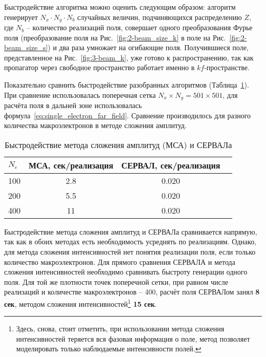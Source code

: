 Быстродействие алгоритма можно оценить следующим образом: алгоритм генерирует $N_x \cdot N_y \cdot N_b$ случайных величин, подчиняющихся распределению $Z$, где $N_b$ -- количество реализаций поля, совершает одного преобразования Фурье поля (преобразование поля на Рис.~\ref{fig:2-beam_size_k} в поле на Рис.~\ref{fig:2-beam_size_s}) и два раза умножает на огибающие поля. Получившиеся поле, представленное на Рис.~\ref{fig:3-beam_k}, уже готово к распространению, так как пропагатор через свободное пространство работает именно в $kf$-пространстве. 

Показательно сравнить быстродействие разобранных алгоритмов (Таблица~\ref{tab:speed}). При сравнение использовалась поперечная сетка $N_x \times N_y = 501 \times 501$, для расчёта поля в дальней зоне использовалась формула~\ref{eq:single_electron_far_field}. Сравнение производилось для разного количества макроэлектронов в методе сложения амплитуд.
\begin{table}[H]
	\caption{Быстродействие метода сложения амплитуд (МСА) и СЕРВАЛа}
	\label{tab:speed}	
	\begin{tabular}{l|c|c|c}
	$N_e$ & МСА, сек/реализация &СЕРВАЛ, сек/реализация \\ 
	\hline
	100   & 2.8 & 0.020\\
	\hline 
	200   & 5.5 & 0.020 \\
	\hline 
	400   & 11  & 0.020 \\
	\end{tabular}
\end{table} 
Быстродействие метода сложения амплитуд и СЕРВАЛа сравнивается напрямую, так как в обоих методах есть необходимость усреднять по реализациям. Однако, для метода сложения интенсивностей нет понятия реализации поля, если только количество макроэлектронов. Для прямого сравнения СЕРВАЛА и метода сложения интенсивностей необходимо сравнивать быстроту генерации одного поля. Для той же плотности точек поперечной сетки, при равном числе реализаций и количестве макроэлектронов -- 400, расчёт поля СЕРВАЛом занял \textbf{8 сек}, методом сложения интенсивностей\footnote{Здесь, снова, стоит отметить, при использовании метода сложения интенсивностей теряется вся фазовая информация о поле, метод позволяет моделировать только наблюдаемые интенсивности полей.} \textbf{15 сек}. 
